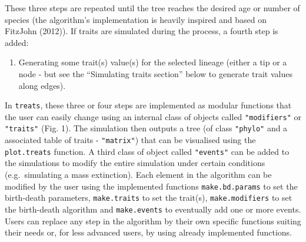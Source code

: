 \documentclass[
]{article}
\providecommand{\tightlist}{%
  \setlength{\itemsep}{0pt}\setlength{\parskip}{0pt}}
\begin{document}
These three steps are repeated until the tree reaches the desired age or
number of species (the algorithm's implementation is heavily inspired
and based on FitzJohn (2012)). If traits are simulated during the
process, a fourth step is added:

\begin{enumerate}
\def\labelenumi{\arabic{enumi}.}
\setcounter{enumi}{3}
\tightlist
\item
  Generating some trait(s) value(s) for the selected lineage (either a
  tip or a node - but see the ``Simulating traits section'' below to
  generate trait values along edges).
\end{enumerate}

In \texttt{treats}, these three or four steps are implemented as modular
functions that the user can easily change using an internal class of
objects called \texttt{"modifiers"} or \texttt{"traits"} (Fig. 1). The
simulation then outputs a tree (of class \texttt{"phylo"} and a
associated table of traits - \texttt{"matrix"}) that can be visualised
using the \texttt{plot.treats} function. A third class of object called
\texttt{"events"} can be added to the simulations to modify the entire
simulation under certain conditions (e.g.~simulating a mass extinction).
Each element in the algorithm can be modified by the user using the
implemented functions \texttt{make.bd.params} to set the birth-death
parameters, \texttt{make.traits} to set the trait(s),
\texttt{make.modifiers} to set the birth-death algorithm and
\texttt{make.events} to eventually add one or more events. Users can
replace any step in the algorithm by their own specific functions
suiting their needs or, for less advanced users, by using already
implemented functions.
\end{document}
